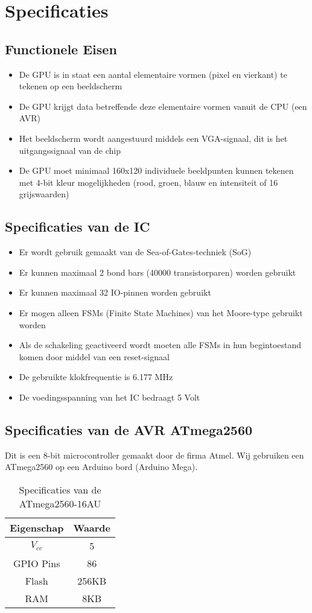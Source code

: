 \documentclass{scrreprt} %
\date{22 november 2013}
\begin{document}
\chapter{Specificaties}
\section {Functionele Eisen}
\begin {itemize}
\item De GPU is in staat een aantal elementaire vormen (pixel en vierkant) te tekenen op een beeldscherm
\item De GPU krijgt data betreffende deze elementaire vormen vanuit de CPU (een AVR)
\item Het beeldscherm wordt aangestuurd middels een VGA-signaal, dit is het uitgangssignaal van de chip
\item De GPU moet minimaal 160x120 individuele beeldpunten kunnen tekenen met 4-bit kleur mogelijkheden (rood, groen, blauw en intensiteit of 16 grijswaarden)
\end{itemize}

\section {Specificaties van de IC}
\begin {itemize}
\item Er wordt gebruik gemaakt van de Sea-of-Gates-techniek (SoG)
\item Er kunnen maximaal 2 bond bars (40000 transistorparen) worden gebruikt
\item Er kunnen maximaal 32 IO-pinnen worden gebruikt
\item Er mogen alleen FSMs (Finite State Machines) van het Moore-type gebruikt worden
\item Als de schakeling geactiveerd wordt moeten alle FSMs in hun begintoestand komen door middel van een reset-signaal
\item De gebruikte klokfrequentie is 6.177 MHz
\item De voedingsspanning van het IC bedraagt 5 Volt
\end{itemize}

\section {Specificaties van de AVR ATmega2560}
Dit is een 8-bit microcontroller gemaakt door de firma Atmel. Wij gebruiken een ATmega2560 op een Arduino bord (Arduino Mega).
\begin{table}[H]
\centering
\caption{Specificaties van de ATmega2560-16AU}
\label{tab:spec-avr}
\begin{tabular}{c c}
	\hline\hline
 	Eigenschap & Waarde\\
 	\hline
	$V_{cc}$ & 5\volt \\
	GPIO Pins & 86 \\
	Flash & 256KB \\
	RAM & 8KB \\
  	\hline
\end{tabular}
\end{table}
\end{document}
